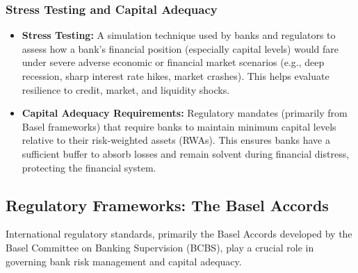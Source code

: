 \subsubsection{Stress Testing and Capital Adequacy}
\begin{itemize}
    \item \textbf{Stress Testing:} A simulation technique used by banks and regulators to assess how a bank's financial position (especially capital levels) would fare under severe adverse economic or financial market scenarios (e.g., deep recession, sharp interest rate hikes, market crashes). This helps evaluate resilience to credit, market, and liquidity shocks.
    \item \textbf{Capital Adequacy Requirements:} Regulatory mandates (primarily from Basel frameworks) that require banks to maintain minimum capital levels relative to their risk-weighted assets (RWAs). This ensures banks have a sufficient buffer to absorb losses and remain solvent during financial distress, protecting the financial system.
\end{itemize}

\subsection{Regulatory Frameworks: The Basel Accords}

International regulatory standards, primarily the Basel Accords developed by the Basel Committee on Banking Supervision (BCBS), play a crucial role in governing bank risk management and capital adequacy.

